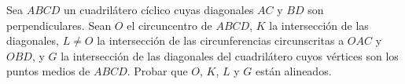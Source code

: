 Sea $ABCD$ un cuadrilátero cíclico cuyas diagonales $AC$ y $BD$ son perpendiculares. Sean $O$ el circuncentro de $ABCD$, $K$ la intersección de las diagonales, $L \neq O$ la intersección de las circunferencias circunscritas a $OAC$ y $OBD$, y $G$ la intersección de las diagonales del cuadrilátero cuyos vértices son los puntos medios de $ABCD$. Probar que $O$, $K$, $L$ y $G$ están alineados.
